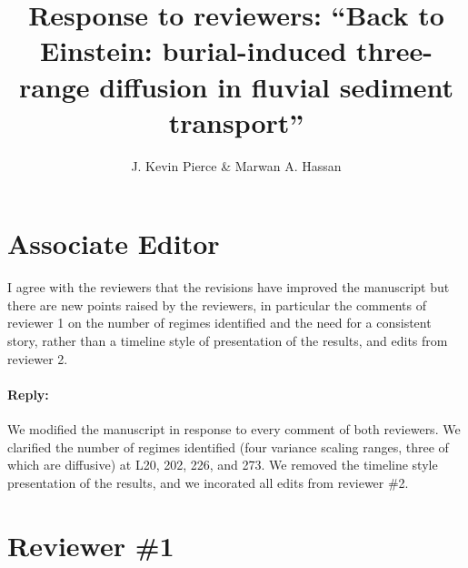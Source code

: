 \documentclass[11pt]{article}
\begin{document}
	
	\title{Response to reviewers: ``Back to Einstein: burial-induced three-range diffusion in fluvial sediment transport''}
	\author{J. Kevin Pierce \& Marwan A. Hassan}
	\maketitle

\section*{Associate Editor}
I agree with the reviewers that the revisions have improved the manuscript but there are new points raised by the reviewers, in particular the comments of reviewer 1 on the number of regimes identified and the need for a consistent story, rather than a timeline style of presentation of the results, and edits from reviewer 2.

\paragraph{Reply:}
We modified the manuscript in response to every comment of both reviewers. 
We clarified the number of regimes identified (four variance scaling ranges, three of which are diffusive) at L20, 202, 226, and 273. We removed the timeline style presentation of the results, and we incorated all edits from reviewer \#2. 

\section*{Reviewer \#1}
\end{document}
